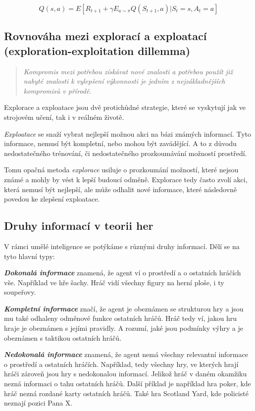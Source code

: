 \begin{equation}
  Q(s, a) = E[R_{t+1} + \gamma E_{a\sim\pi}Q(S_{t+1}, a) | S_t = s, A_t = a]\label{eq:bellman2}
\end{equation}

\subsection{Rovnováha mezi explorací a exploatací (exploration-exploitation dillemma)}
\label{subsec:exploration-exploitation-dillemma}
\begin{quote}
  \emph{Kompromis mezi potřebou získávat nové znalosti a potřebou použít již nabyté znalosti k vylepšení výkonnosti je jedním z nejzákladnějších kompromisů v přírodě.~\cite{Exploitation_Exploration}}
\end{quote}
Explorace a exploatace jsou dvě protichůdné strategie, které se vyskytují jak ve strojovém učení, tak i v reálném životě.

\emph{Exploatace} se snaží vybrat nejlepší možnou akci na bázi známých informací.
Tyto informace, nemusí být kompletní, nebo mohou být zavádějící.
A to z důvodu nedostatečného trénování, či nedostatečného prozkoumávání možností prostředí.

Tomu opačná metoda \emph{explorace} usiluje o prozkoumání možností, které nejsou známé a mohly by vést k lepší budoucí odměně.
Explorace tedy často zvolí akci, která nemusí být nejlepší, ale může odhalit nové informace, které následovně povedou ke zlepšení exploatace.

\subsection{Druhy informací v teorii her}\label{subsec:druhy-informaci-v-teorii-her}
V rámci umělé inteligence se potýkáme s různými druhy informací.
Dělí se na tyto hlavní typy:

\textbf{\emph{Dokonalá informace}} znamená, že agent ví o prostředí a o ostatních hráčích vše.
Například ve hře šachy.
Hráč vidí všechny figury na herní ploše, i ty soupeřovy.

\textbf{\emph{Kompletní informace}} značí, že agent je obeznámen se strukturou hry a jsou mu také odhaleny odměnové funkce ostatních hráčů.
Hráč tedy ví, jakou hru hraje je obeznámen s jejími pravidly.
A rozumí, jaké jsou podmínky výhry a je obeznámen s taktikou ostatních hráčů.

\textbf{\emph{Nedokonalá informace}} znamená, že agent nemá všechny relevantní informace o prostředí a ostatních hráčích.
Například, tedy všechny hry, ve kterých hrají hráči zároveň jsou hry s nedokonalou informací.
Jelikož hráč v daném okamžiku nezná informaci o tahu ostatních hráčů.
Další příklad je například hra poker, kde hráč nezná rozdané karty ostatních hráčů.
Také hra Scotland Yard, kde policisté neznají pozici Pana X\@.

